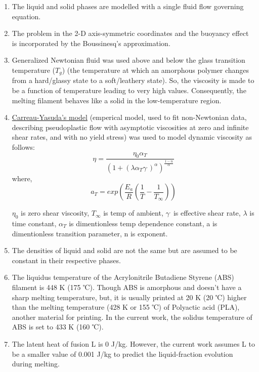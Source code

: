 \documentclass{report}
\begin{document}
\begin{enumerate}
    \item The liquid and solid phases are modelled with a single fluid flow governing equation.

    \item The problem in the 2-D axis-symmetric coordinates and the buoyancy effect is incorporated by the Boussinesq's approximation. 

    \item Generalized Newtonian fluid was used above and below the glass transition temperature ($T_g$) (the temperature at which an amorphous polymer changes from a hard/glassy state to a soft/leathery state). So, the viscosity is made to be a function of temperature leading to very high values. Consequently, the melting filament behaves like a solid in the low-temperature region.

    \item \href{https://blog.rheosense.com/modeling-non-newtonian-fluids#:~:text=The%20Carreau%2DYasuda%20model%20is,Hackley%20and%20Ferraris%2C%202001)}{Carreau-Yasuda’s model} (emperical model, used to fit non-Newtonian data, describing pseudoplastic flow with asymptotic viscosities at zero and infinite shear rates, and with no yield stress) was used to model dynamic viscosity as follows: \[\eta = \frac{\eta_0 \alpha_T}{\left(1+(\lambda\alpha_T\gamma^.)^\alpha\right)^\frac{1-n}{\alpha}}\]
    where,
    \[a_T = exp\left(\frac{E_a}{R}\left(\frac{1}{T}-\frac{1}{T_{\infty}}\right)\right)\]
    
    $\eta_0$ is zero shear viscosity, $T_\infty$ is temp of ambient, $\gamma^.$ is effective shear rate, $\lambda$ is time constant, $\alpha_T$ is dimentionless temp dependence constant, a is dimentionless transition parameter, n is exponent.
    
    \item The densities of liquid and solid are not the same but are assumed to be constant in their respective phases.
    
    \item The liquidus temperature of the Acrylonitrile Butadiene Styrene (ABS) filament is 448 K (175 ℃). Though ABS is amorphous and doesn’t have a sharp melting temperature, but, it is usually printed at 20 K (20 ℃) higher than the melting temperature (428 K or 155 ℃) of Polyactic acid (PLA), another material for printing. In the current work, the solidus temperature of ABS is set to 433 K (160 ℃).

    \item The latent heat of fusion L is 0 J/kg. However, the current work assumes L to be a smaller value of 0.001 J/kg to predict the liquid-fraction evolution during melting.
\end{enumerate}
\end{document}
